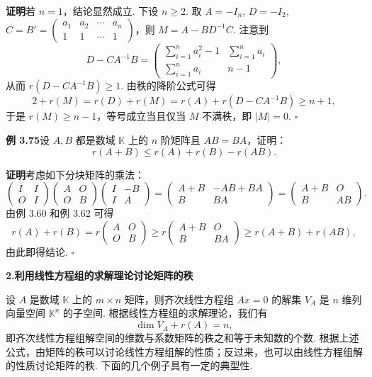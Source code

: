 \documentclass[UTF8,12pt,a4paper,fontset=fandol]{ctexart}
\begin{document}
\noindent\textbf{证明}\quad 若 $n=1$，结论显然成立. 下设 $n\ge 2$. 取 $A=-I_n$, $D=-I_2$, $C=B'=\begin{pmatrix}a_1&a_2&\cdots&a_n\\1&1&\cdots&1\end{pmatrix}$，则 $M=A-BD^{-1}C$. 注意到
\[
D-CA^{-1}B=
\begin{pmatrix}
\sum_{i=1}^n a_i^2-1 & \sum_{i=1}^n a_i\\
\sum_{i=1}^n a_i & n-1
\end{pmatrix},
\]
从而 $r(D-CA^{-1}B)\ge 1$. 由秩的降阶公式可得
\[
2+r(M)=r(D)+r(M)=r(A)+r(D-CA^{-1}B)\ge n+1,
\]
于是 $r(M)\ge n-1$，等号成立当且仅当 $M$ 不满秩，即 $|M|=0$. $\square$

\noindent\textbf{例 3.75}\quad 设 $A,B$ 都是数域 $\mathbb{K}$ 上的 $n$ 阶矩阵且 $AB=BA$，证明：
\[
r(A+B)\le r(A)+r(B)-r(AB).
\]

\noindent\textbf{证明}\quad 考虑如下分块矩阵的乘法：
\[
\begin{pmatrix}I&I\\O&I\end{pmatrix}
\begin{pmatrix}A&O\\O&B\end{pmatrix}
\begin{pmatrix}I&-B\\I&A\end{pmatrix}
=
\begin{pmatrix}A+B&-AB+BA\\B&BA\end{pmatrix}
=
\begin{pmatrix}A+B&O\\B&AB\end{pmatrix}.
\]
由例 3.60 和例 3.62 可得
\[
r(A)+r(B)=r\begin{pmatrix}A&O\\O&B\end{pmatrix}
\ge r\begin{pmatrix}A+B&O\\B&BA\end{pmatrix}
\ge r(A+B)+r(AB),
\]
由此即得结论. $\square$

\noindent\textbf{2.\quad 利用线性方程组的求解理论讨论矩阵的秩}

设 $A$ 是数域 $\mathbb{K}$ 上的 $m\times n$ 矩阵，则齐次线性方程组 $Ax=0$ 的解集 $V_A$ 是 $n$ 维列向量空间 $\mathbb{K}^n$ 的子空间. 根据线性方程组的求解理论，我们有
\[
\dim V_A+r(A)=n,
\]
即齐次线性方程组解空间的维数与系数矩阵的秩之和等于未知数的个数. 根据上述公式，由矩阵的秩可以讨论线性方程组解的性质；反过来，也可以由线性方程组解的性质讨论矩阵的秩. 下面的几个例子具有一定的典型性.
\end{document}

